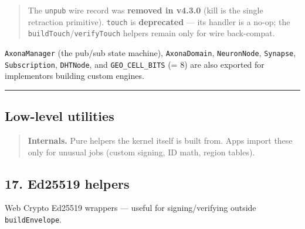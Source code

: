 \documentclass[
  nobib]{tufte-handout}
\begin{document}
\begin{quote}
The \texttt{unpub} wire record was \textbf{removed in v4.3.0} (kill is
the single retraction primitive). \texttt{touch} is \textbf{deprecated}
--- its handler is a no-op; the \texttt{buildTouch}/\texttt{verifyTouch}
helpers remain only for wire back-compat.
\end{quote}

\texttt{AxonaManager} (the pub/sub state machine), \texttt{AxonaDomain},
\texttt{NeuronNode}, \texttt{Synapse}, \texttt{Subscription},
\texttt{DHTNode}, and \texttt{GEO\_CELL\_BITS} (= 8) are also exported
for implementors building custom engines.

\begin{center}\rule{0.5\linewidth}{0.5pt}\end{center}

\subsection{Low-level utilities}\label{low-level-utilities-1}

\begin{quote}
\textbf{Internals.} Pure helpers the kernel itself is built from. Apps
import these only for unusual jobs (custom signing, ID math, region
tables).
\end{quote}

\subsection{17. Ed25519 helpers}\label{ed25519-helpers}

Web Crypto Ed25519 wrappers --- useful for signing/verifying outside
\texttt{buildEnvelope}.
\end{document}
